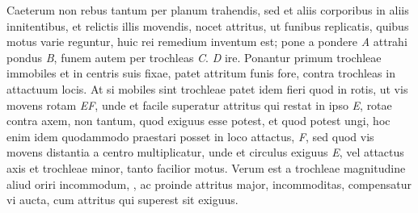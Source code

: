 Caeterum non rebus tantum per planum trahendis, sed et aliis corporibus in aliis innitentibus, et relictis illis movendis, nocet attritus\protect{}, ut funibus\protect{} replicatis, quibus motus varie reguntur, huic rei remedium inventum est; pone a pondere \textit{A} attrahi pondus\protect{} \textit{B}, funem\protect{} autem per trochleas\protect{} \textit{C}. \textit{D} ire. Ponantur primum trochleae\protect{} immobiles et in centris suis fixae, patet attritum\protect{} funis\protect{} fore, contra trochleas\protect{} in attactuum locis. At si mobiles sint trochleae\protect{} patet idem fieri quod in rotis, ut vis movens\protect{} rotam  \textit{EF}, unde et facile superatur attritus\protect{} qui restat in ipso \textit{E}, rotae contra axem, non tantum, quod exiguus esse potest, et quod potest ungi, hoc enim idem quodammodo praestari posset in loco attactus, \textit{F}, sed quod vis movens\protect{} distantia a centro multiplicatur, unde  et circulus exiguus \textit{E}, vel attactus axis et trochleae\protect{} minor, tanto facilior motus. Verum est a trochleae\protect{} magnitudine aliud oriri incommodum,  , ac proinde attritus\protect{} major,  incommoditas, compensatur vi aucta, cum attritus\protect{} qui superest sit exiguus. 
\pend
\pstart
